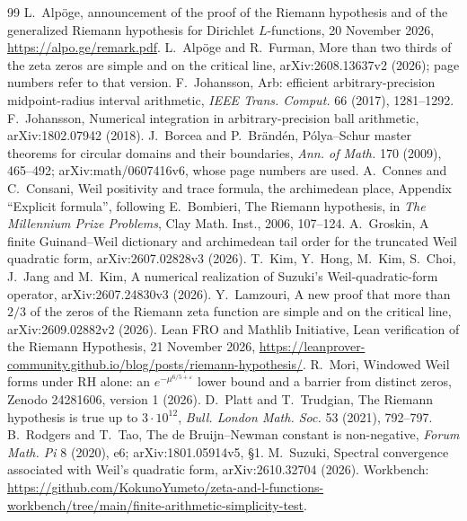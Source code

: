 \documentclass[11pt,a4paper]{article}
\theoremstyle{plain}
\theoremstyle{remark}
\newcommand{\workbenchurl}{https://github.com/KokunoYumeto/zeta-and-l-functions-workbench/tree/main/finite-arithmetic-simplicity-test}
\begin{document}
\begin{thebibliography}{99}\small
{} L.~Alp\"oge, announcement of the proof of the Riemann hypothesis and of the generalized Riemann
hypothesis for Dirichlet $L$-functions, 20 November 2026, \url{https://alpo.ge/remark.pdf}.
 L.~Alp\"oge and R.~Furman, More than two thirds of the zeta zeros are simple and on the
critical line, arXiv:2608.13637v2 (2026); page numbers refer to that version.
 F.~Johansson, Arb: efficient arbitrary-precision midpoint-radius interval arithmetic, \emph{IEEE Trans.
Comput.} 66 (2017), 1281--1292.
 F.~Johansson, Numerical integration in arbitrary-precision ball arithmetic, arXiv:1802.07942
(2018).
 J.~Borcea and P.~Br\"and\'en, P\'olya--Schur master theorems for circular domains and their
boundaries, \emph{Ann. of Math.} 170 (2009), 465--492; arXiv:math/0607416v6, whose page numbers are used.
 A.~Connes and C.~Consani, Weil positivity and trace formula, the archimedean place, Appendix
``Explicit formula'', following E.~Bombieri, The Riemann hypothesis, in \emph{The Millennium Prize Problems}, Clay
Math. Inst., 2006, 107--124.
 A.~Groskin, A finite Guinand--Weil dictionary and archimedean tail order for the truncated Weil
quadratic form, arXiv:2607.02828v3 (2026).
 T.~Kim, Y.~Hong, M.~Kim, S.~Choi, J.~Jang and M.~Kim, A numerical realization of Suzuki's
Weil-quadratic-form operator, arXiv:2607.24830v3 (2026).
 Y.~Lamzouri, A new proof that more than $2/3$ of the zeros of the Riemann zeta function are simple
and on the critical line, arXiv:2609.02882v2 (2026).
 Lean FRO and Mathlib Initiative, Lean verification of the Riemann Hypothesis, 21 November 2026,
\url{https://leanprover-community.github.io/blog/posts/riemann-hypothesis/}.
 R.~Mori, Windowed Weil forms under RH alone: an $e^{-\mu^{6/5+\varepsilon}}$ lower bound and a barrier
from distinct zeros, Zenodo 24281606, version 1 (2026).
 D.~Platt and T.~Trudgian, The Riemann hypothesis is true up to $3\cdot10^{12}$, \emph{Bull.
London Math. Soc.} 53 (2021), 792--797.
 B.~Rodgers and T.~Tao, The de Bruijn--Newman constant is non-negative, \emph{Forum Math. Pi} 8
(2020), e6; arXiv:1801.05914v5, §1.
 M.~Suzuki, Spectral convergence associated with Weil's quadratic form, arXiv:2610.32704 (2026).
 Workbench: \url{\workbenchurl}.
\end{thebibliography}
\end{document}
